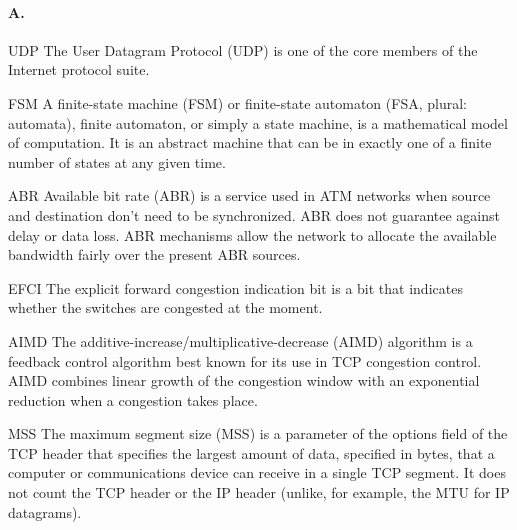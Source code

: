 \paragraph{A.}
\subitem UDP
The User Datagram Protocol (UDP) is one of the core members of the Internet protocol suite.

\subitem FSM
A finite-state machine (FSM) or finite-state automaton (FSA, plural: automata), finite automaton, or simply a state machine, is a mathematical model of computation. It is an abstract machine that can be in exactly one of a finite number of states at any given time. 

\subitem ABR
Available bit rate (ABR) is a service used in ATM networks when source and destination don't need to be synchronized. ABR does not guarantee against delay or data loss. ABR mechanisms allow the network to allocate the available bandwidth fairly over the present ABR sources. 

\subitem EFCI
The explicit forward congestion indication bit is a bit that indicates whether the switches are congested at the moment.

\subitem AIMD
The additive-increase/multiplicative-decrease (AIMD) algorithm is a feedback control algorithm best known for its use in TCP congestion control. AIMD combines linear growth of the congestion window with an exponential reduction when a congestion takes place. 

\subitem MSS
The maximum segment size (MSS) is a parameter of the options field of the TCP header that specifies the largest amount of data, specified in bytes, that a computer or communications device can receive in a single TCP segment. It does not count the TCP header or the IP header (unlike, for example, the MTU for IP datagrams).